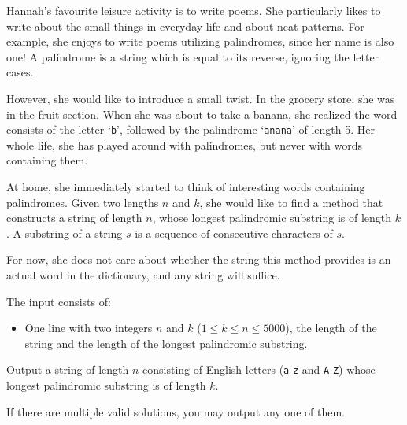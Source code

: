 

\newcommand{\maxn}{5000}
\newcommand{\person}{Hannah}

\person's favourite leisure activity is to write poems. She particularly likes
to write about the small things in everyday life and about neat patterns. For
example, she enjoys to write poems utilizing palindromes, since her name is also
one! A palindrome is a string which is equal to its reverse, ignoring the letter
cases.

However, she would like to introduce a small twist. In the grocery store, she
was in the fruit section. When she was about to take a banana, she realized the
word consists of the letter `\texttt{b}', followed by the palindrome
`\texttt{anana}' of length 5. Her whole life, she has played around with
palindromes, but never with words containing them. 

At home, she immediately started to think of interesting words containing
palindromes. Given two lengths $n$ and $k$, she would like to find a method that
constructs a string of length $n$, whose longest palindromic substring is of
length $k$. A substring of a string $s$ is a sequence of consecutive characters
of $s$.

For now, she does not care about whether the string this method provides is an
actual word in the dictionary, and any string will suffice.

\begin{Input}
    The input consists of:
    \begin{itemize}
        \item One line with two integers $n$ and $k$ ($1\leq k\leq n\leq \maxn$), the
            length of the string and the length of the longest palindromic
            substring.
    \end{itemize}
\end{Input}

\begin{Output}
    Output a string of length $n$ consisting of English letters
    (\texttt{a}-\texttt{z} and \texttt{A}-\texttt{Z}) whose longest palindromic
    substring is of length $k$.

    If there are multiple valid solutions, you may output any one of them.
\end{Output}
